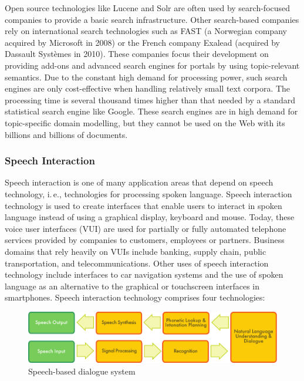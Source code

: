 \documentclass[]{../../metanetpaper}
\begin{document}
\begin{multicols}{2}
Open source technologies like Lucene and Solr are often used by search-focused companies to provide a basic search infrastructure. Other search-based companies rely on international search technologies such as FAST (a Norwegian company acquired by Microsoft in 2008) or the French company Exalead (acquired by Dassault Systèmes in 2010). These companies focus their development on providing add-ons and advanced search engines for portals by using topic-relevant semantics. Due to the constant high demand for processing power, such search engines are only cost-effective when handling relatively small text corpora. The processing time is several thousand times higher than that needed by a standard statistical search engine like Google. These search engines are in high demand for topic-specific domain modelling, but they cannot be used on the Web with its billions and billions of documents.

\subsubsection{Speech Interaction}

Speech interaction is one of many application areas that depend on speech technology, i.\,e., technologies for processing spoken language. Speech interaction technology is used to create interfaces that enable users to interact in spoken language instead of using a graphical display, keyboard and mouse.  Today, these voice user interfaces (VUI) are used for partially or fully automated telephone services provided by companies to customers, employees or partners. Business domains that rely heavily on VUIs include banking, supply chain, public transportation, and telecommunications. Other uses of speech interaction technology include interfaces to car navigation systems and the use of spoken language as an alternative to the graphical or touchscreen interfaces in smartphones. Speech interaction technology comprises four technologies: 

\begin{figure}[htb]
  \center
  \includegraphics[width=\textwidth]{../_media/english/simple_speech-based_dialogue_architecture}
  \caption{Speech-based dialogue system}
  \label{fig:dialoguearch_en}
\end{figure}


\end{multicols}
\end{document}
